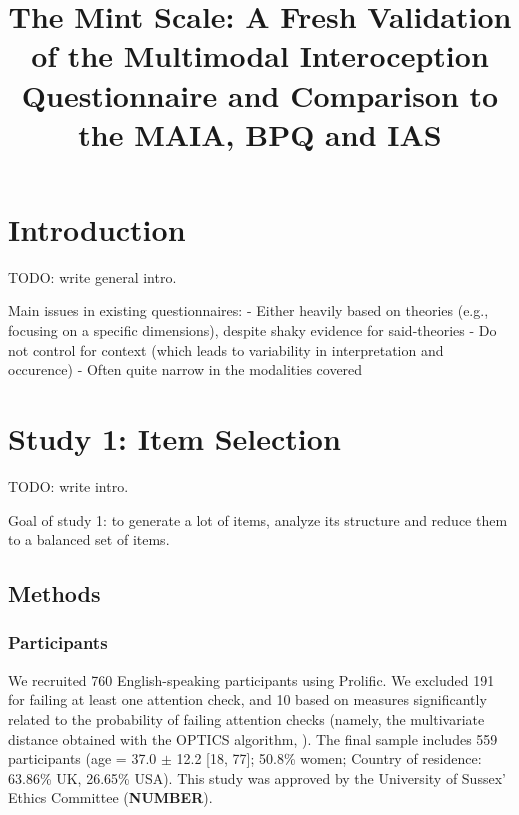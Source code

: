 \documentclass[
  jou,
  floatsintext,
  longtable,
  nolmodern,
  notxfonts,
  notimes,
  colorlinks=true,linkcolor=blue,citecolor=blue,urlcolor=blue]{apa7}
\title{\textbf{The Mint Scale: A Fresh Validation of the Multimodal
Interoception Questionnaire and Comparison to the MAIA, BPQ and IAS}}
\begin{document}
\maketitle



\setcounter{secnumdepth}{-\maxdimen} %

\setlength\LTleft{0pt}




\section{Introduction}\label{introduction}

TODO: write general intro.

Main issues in existing questionnaires: - Either heavily based on
theories (e.g., focusing on a specific dimensions), despite shaky
evidence for said-theories - Do not control for context (which leads to
variability in interpretation and occurence) - Often quite narrow in the
modalities covered

\section{Study 1: Item Selection}\label{study-1-item-selection}

TODO: write intro.

Goal of study 1: to generate a lot of items, analyze its structure and
reduce them to a balanced set of items.

\subsection{Methods}\label{methods}

\subsubsection{Participants}\label{participants}

We recruited 760 English-speaking participants using
Prolific\textcopyright. We excluded 191 for failing at least one
attention check, and 10 based on measures significantly related to the
probability of failing attention checks (namely, the multivariate
distance obtained with the OPTICS algorithm,
). The final
sample includes 559 participants (age = 37.0 \(\pm\) 12.2 {[}18, 77{]};
50.8\% women; Country of residence: 63.86\% UK, 26.65\% USA). This study
was approved by the University of Sussex' Ethics Committee
(\textbf{NUMBER}).
\end{document}

